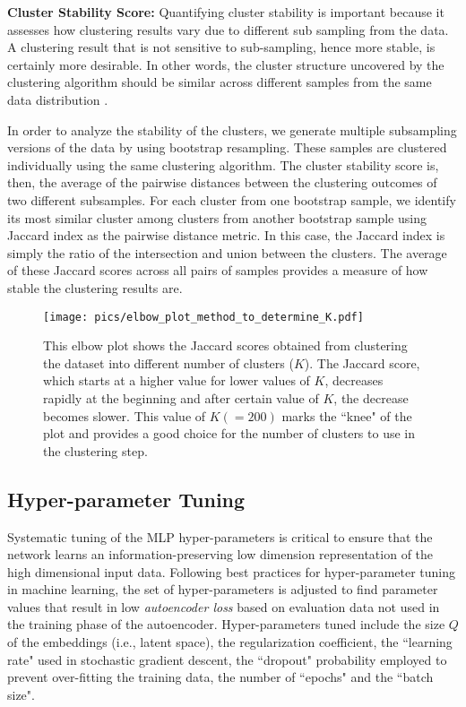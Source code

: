\documentclass[manuscript, nonacm]{acmart}
\newcommand{\para}[1]{\vspace*{1ex}\noindent\textbf{#1} }
\begin{document}
\para{Cluster Stability Score:} 
Quantifying cluster stability is important because it assesses how
clustering results vary due to different sub sampling from the data.
A clustering result that is not sensitive to sub-sampling, hence more stable,
is certainly more desirable.  
In other words, the cluster structure uncovered by the clustering
algorithm should be similar across different samples from the same data distribution \cite{luxburg2010stability}.

In order to analyze the stability of the clusters, we generate multiple subsampling versions of the data by using bootstrap resampling. These samples are clustered individually using the same clustering algorithm. The cluster stability score is, then, the average of the pairwise distances between the clustering outcomes of two different subsamples. For each cluster from one bootstrap sample, we identify its most similar cluster among clusters from another bootstrap sample using Jaccard index as the pairwise distance metric. In this case, the Jaccard index is simply the ratio of the intersection and union between the clusters. The average of these Jaccard scores across all pairs
of samples provides a measure of how stable the clustering results are. 

\begin{figure}[ht]
    \centering
    \texttt{[image: pics/elbow\_plot\_method\_to\_determine\_K.pdf]}
    \caption{This elbow plot shows the Jaccard scores obtained from clustering the dataset into different number of clusters ($K$). The Jaccard score, which starts at a higher value for lower values of $K$, decreases rapidly at the beginning and after certain value of $K$, the decrease becomes slower. This value of $K(=200)$ marks the ``knee"
    of the plot and provides a good choice for the number of clusters to use in the clustering step.}
    \label{fig:sizeK}
\end{figure}

\subsection{Hyper-parameter Tuning}
\label{sec:tune}

Systematic tuning of the MLP hyper-parameters is critical
to ensure that the network learns an information-preserving low dimension 
representation of the high dimensional input data.
Following best practices for hyper-parameter tuning in machine learning,
the set of hyper-parameters is adjusted to find parameter values
that result in low \emph{autoencoder loss} based on evaluation data
not used in the training phase of the autoencoder. Hyper-parameters tuned include
the size $Q$ of the embeddings (i.e., latent space),
the regularization coefficient,
the ``learning rate" used in stochastic gradient descent, 
the ``dropout" probability employed to prevent over-fitting the training data,
the number of ``epochs"
and the ``batch size". 
\end{document}
